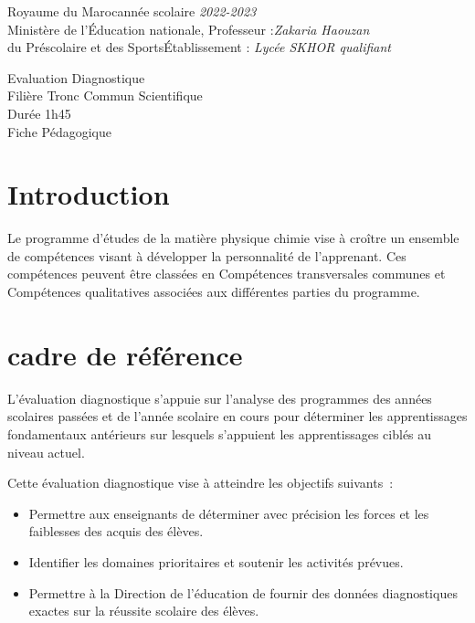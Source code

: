 \documentclass[12pt]{article}
\newcommand\headerMe[2]{\noindent{}#1\hfill#2}
\begin{document}
\headerMe{Royaume du Maroc}{année scolaire \emph{2022-2023}}\\
\headerMe{Ministère de l'Éducation nationale, }{  Professeur :\emph{Zakaria Haouzan}}\\
\headerMe{du Préscolaire et des Sports}{Établissement : \emph{Lycée SKHOR qualifiant}}\\

\begin{center}
Evaluation Diagnostique \\
Filière Tronc Commun Scientifique\\
Durée 1h45
\\
    \vspace{.2cm}
\hrulefill
\Large{Fiche Pédagogique}
\hrulefill\\
\end{center}


\section[A]{Introduction }
\hspace{0.5cm}Le programme d'études de la matière physique chimie vise à croître un ensemble de compétences visant à développer la personnalité de l'apprenant. Ces compétences peuvent être classées en Compétences transversales communes et Compétences qualitatives associées aux différentes parties du programme.
\section{cadre de référence }
 \hspace{0.5cm}
L'évaluation diagnostique s'appuie sur l'analyse des programmes des années scolaires passées et de l'année scolaire en cours pour déterminer les apprentissages fondamentaux antérieurs sur lesquels s'appuient les apprentissages ciblés au niveau actuel.

Cette évaluation diagnostique vise à atteindre les objectifs suivants :
\begin{itemize}
	\item Permettre aux enseignants de déterminer avec précision les forces et les faiblesses des acquis des élèves.
	\item Identifier les domaines prioritaires et soutenir les activités prévues.
	\item Permettre à la Direction de l'éducation de fournir des données diagnostiques exactes sur la réussite scolaire des élèves.
\end{itemize}
\end{document}
